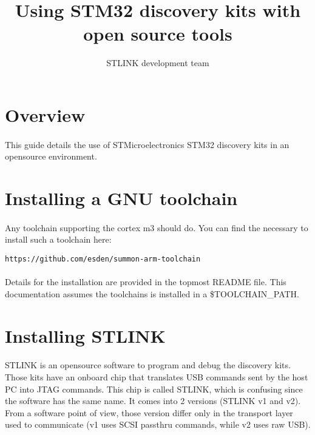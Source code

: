 \documentclass[a4paper, 11pt]{article}
\begin{document}
\title{Using STM32 discovery kits with open source tools}
\author{STLINK development team}
\date{}

\maketitle

\newpage
\tableofcontents
{}


\newpage

\section{Overview}
\paragraph{}
This guide details the use of STMicroelectronics STM32 discovery kits in
an opensource environment.


\newpage

\section{Installing a GNU toolchain}
\paragraph{}
Any toolchain supporting the cortex m3 should do. You can find the necessary
to install such a toolchain here:\\
\begin{small}
\begin{lstlisting}[frame=tb]
https://github.com/esden/summon-arm-toolchain
\end{lstlisting}
\end{small}

\paragraph{}
Details for the installation are provided in the topmost README file.
This documentation assumes the toolchains is installed in a \$TOOLCHAIN\_PATH.


\newpage

\section{Installing STLINK}
\paragraph{}
STLINK is an opensource software to program and debug the discovery kits. Those
kits have an onboard chip that translates USB commands sent by the host PC into
JTAG commands. This chip is called STLINK, which is confusing since the software
has the same name. It comes into 2 versions (STLINK v1 and v2). From a software
point of view, those version differ only in the transport layer used to communicate
(v1 uses SCSI passthru commands, while v2 uses raw USB).
\end{document}

